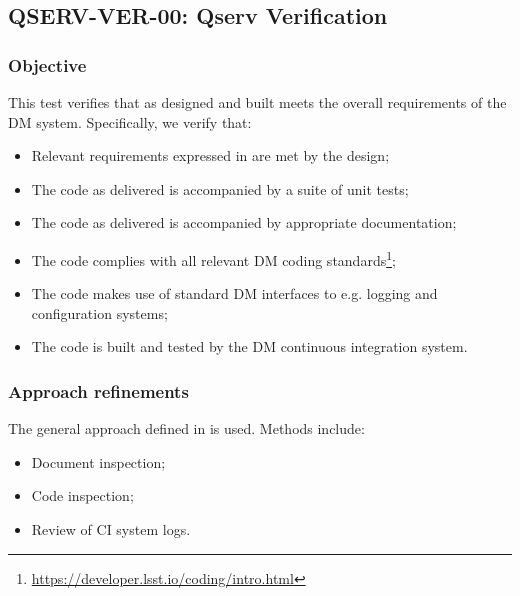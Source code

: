 \subsection{\textsc{QSERV-VER-00}: Qserv Verification}
\label{qserv-ver-00}

\subsubsection{Objective}

This test verifies that \product{} as designed and built meets the overall requirements of the DM system.
Specifically, we verify that:

\begin{itemize}

  \item{Relevant requirements expressed in  are met by the design;}

  \item{The code as delivered is accompanied by a suite of unit tests;}

  \item{The code as delivered is accompanied by appropriate documentation;}

  \item{The code complies with all relevant DM coding standards\footnote{\url{https://developer.lsst.io/coding/intro.html}};}

  \item{The code makes use of standard DM interfaces to e.g. logging and configuration systems;}

  \item{The code is built and tested by the DM continuous integration system.}

\end{itemize}

\subsubsection{Approach refinements}

The general approach defined in  is used. Methods include:

\begin{itemize}
  \item{Document inspection;}
  \item{Code inspection;}
  \item{Review of CI system logs.}
\end{itemize}

